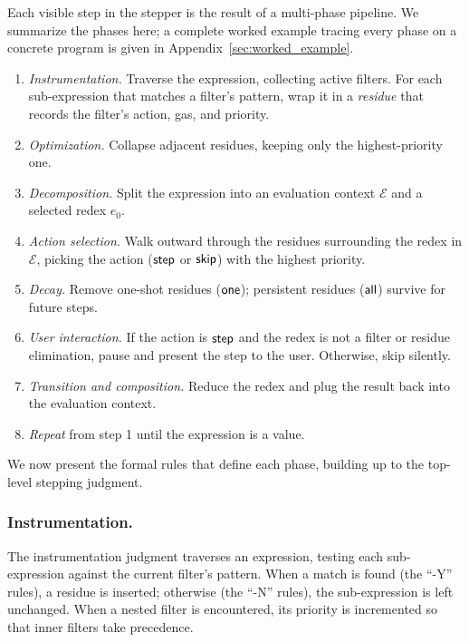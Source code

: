 Each visible step in the stepper is the result of a multi-phase
pipeline. We summarize the phases here; a complete worked example
tracing every phase on a concrete program is given in
Appendix~\ref{sec:worked_example}.

\begin{enumerate}
\item \emph{Instrumentation.} Traverse the expression, collecting
  active filters. For each sub-expression that matches a filter's
  pattern, wrap it in a \emph{residue} that records the filter's
  action, gas, and priority.
\item \emph{Optimization.} Collapse adjacent residues, keeping only
  the highest-priority one.
\item \emph{Decomposition.} Split the expression into an evaluation
  context \(\mathcal{E}\) and a selected redex \(e_0\).
\item \emph{Action selection.} Walk outward through the residues
  surrounding the redex in \(\mathcal{E}\), picking the action
  (\(\mathsf{step}\) or \(\mathsf{skip}\)) with the highest priority.
\item \emph{Decay.} Remove one-shot residues (\(\mathsf{one}\)); persistent
  residues (\(\mathsf{all}\)) survive for future steps.
\item \emph{User interaction.} If the action is \(\mathsf{step}\) and the
  redex is not a filter or residue elimination, pause and present the
  step to the user. Otherwise, skip silently.
\item \emph{Transition and composition.} Reduce the redex and plug the
  result back into the evaluation context.
\item \emph{Repeat} from step 1 until the expression is a value.
\end{enumerate}

We now present the formal rules that define each phase, building
up to the top-level stepping judgment.

\subsubsection{Instrumentation.} The instrumentation judgment traverses
an expression, testing each sub-expression against the current filter's
pattern. When a match is found (the ``-Y'' rules), a residue is
inserted; otherwise (the ``-N'' rules), the sub-expression is left
unchanged. When a nested filter is encountered, its priority is
incremented so that inner filters take precedence.

